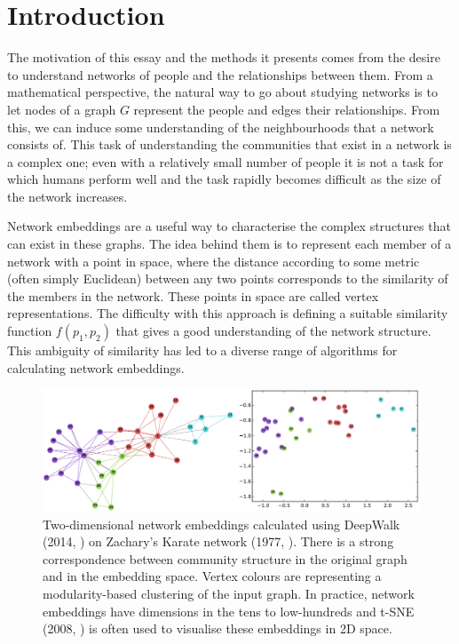 \documentclass[a4paper]{article}
\begin{document}


\tableofcontents

\section{Introduction}
The motivation of this essay and the methods it presents comes from the desire to understand networks of people and the relationships between them.
From a mathematical perspective, the natural way to go about studying networks is to let nodes of a graph $G$ represent the people and edges their relationships.
From this, we can induce some understanding of the neighbourhoods that a network consists of. This task of understanding the communities that exist in a network is a complex one; 
even with a relatively small number of people it is not a task for which humans perform well and the task rapidly becomes difficult as the size of the network increases.\par
Network embeddings are a useful way to characterise the complex structures that
can exist in these graphs. The idea behind them is to represent each member of a
network with a point in space, where the distance according to some metric
(often simply Euclidean) between any two points corresponds to the similarity of
the members in the network. These points in space are called vertex
representations. The difficulty with this approach is defining a suitable
similarity function $f(p_1,p_2)$ that gives a good understanding of the network
structure. This ambiguity of similarity has led to a diverse range of algorithms for calculating network embeddings.

\begin{figure}[h!]
  \centering
  \includegraphics[width = 1\textwidth]{src/DeepWalkOnKarateGraph.png}

  \caption{Two-dimensional network embeddings calculated using
    DeepWalk (2014, \cite{deepwalk}) on Zachary's Karate network (1977, \cite{zachary1977}). There is a strong
    correspondence between community structure in the original graph and
    in the embedding space. Vertex colours are representing a modularity-based
    clustering of the input graph. In practice, network embeddings have dimensions
    in the tens to low-hundreds and t-SNE (2008, \cite{maaten2008}) is often used to visualise these embeddings in 2D
    space.}
\end{figure}
\end{document}

